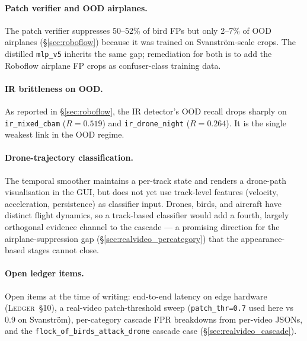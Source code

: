 \paragraph{Patch verifier and OOD airplanes.}
The patch verifier suppresses 50--52\% of bird FPs but only 2--7\% of OOD airplanes (\S\ref{sec:roboflow}) because it was trained on Svanstr\"om-scale crops. The distilled \texttt{mlp\_v5} inherits the same gap; remediation for both is to add the Roboflow airplane FP crops as confuser-class training data.

\paragraph{IR brittleness on OOD.}
As reported in \S\ref{sec:roboflow}, the IR detector's OOD recall drops sharply on \texttt{ir\_mixed\_cbam} ($R=0.519$) and \texttt{ir\_drone\_night} ($R=0.264$). It is the single weakest link in the OOD regime.

\paragraph{Drone-trajectory classification.}
The temporal smoother maintains a per-track state and renders a drone-path visualisation in the GUI, but does not yet use track-level features (velocity, acceleration, persistence) as classifier input. Drones, birds, and aircraft have distinct flight dynamics, so a track-based classifier would add a fourth, largely orthogonal evidence channel to the cascade --- a promising direction for the airplane-suppression gap (\S\ref{sec:realvideo_percategory}) that the appearance-based stages cannot close.

\paragraph{Open ledger items.}
Open items at the time of writing: end-to-end latency on edge hardware (\textsc{Ledger}~\S10), a real-video patch-threshold sweep (\texttt{patch\_thr=0.7} used here vs 0.9 on Svanstr\"om), per-category cascade FPR breakdowns from per-video JSONs, and the \texttt{flock\_of\_birds\_attack\_drone} cascade case (\S\ref{sec:realvideo_cascade}).

